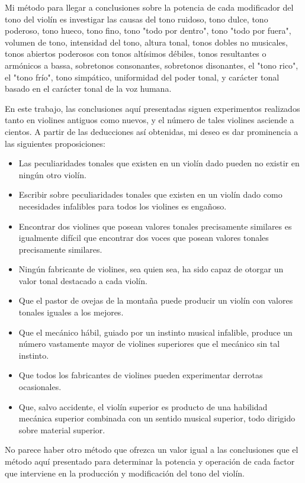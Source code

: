 \documentclass[12pt]{book}
\begin{document}
Mi método para llegar a conclusiones sobre la potencia de cada modificador del tono del violín es investigar las causas del tono ruidoso, tono dulce, tono poderoso, tono hueco, tono fino, tono "todo por dentro", tono "todo por fuera", volumen de tono, intensidad del tono, altura tonal, tonos dobles no musicales, tonos abiertos poderosos con tonos altísimos débiles, tonos resultantes o armónicos a bassa, sobretonos consonantes, sobretonos disonantes, el "tono rico", el "tono frío", tono simpático, uniformidad del poder tonal, y carácter tonal basado en el carácter tonal de la voz humana.

En este trabajo, las conclusiones aquí presentadas siguen experimentos realizados tanto en violines antiguos como nuevos, y el número de tales violines asciende a cientos. A partir de las deducciones así obtenidas, mi deseo es dar prominencia a las siguientes proposiciones:
\begin{itemize}
 \item Las peculiaridades tonales que existen en un violín dado pueden no existir en ningún otro violín.
 \item Escribir sobre peculiaridades tonales que existen en un violín dado como necesidades infalibles para todos los violines es engañoso.
 \item Encontrar dos violines que posean valores tonales precisamente similares es igualmente difícil que encontrar dos voces que posean valores tonales precisamente similares.
 \item Ningún fabricante de violines, sea quien sea, ha sido capaz de otorgar un valor tonal destacado a cada violín.
 \item Que el pastor de ovejas de la montaña puede producir un violín con valores tonales iguales a los mejores.
 \item Que el mecánico hábil, guiado por un instinto musical infalible, produce un número vastamente mayor de violines superiores que el mecánico sin tal instinto.
 \item Que todos los fabricantes de violines pueden experimentar derrotas ocasionales.
 \item Que, salvo accidente, el violín superior es producto de una habilidad mecánica superior combinada con un sentido musical superior, todo dirigido sobre material superior.
\end{itemize}
No parece haber otro método que ofrezca un valor igual a las conclusiones que el método aquí presentado para determinar la potencia y operación de cada factor que interviene en la producción y modificación del tono del violín.
\end{document}
